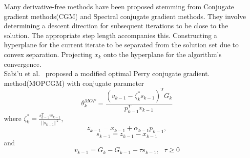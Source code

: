 \documentclass{article}
\theoremstyle{remark}
\begin{document}
Many derivative-free methods have been proposed stemming from Conjugate gradient methods(CGM) and Spectral conjugate gradient methods. They involve determining a descent direction for subsequent iterations to be close to the solution. The appropriate step length accompanies this. Constructing a hyperplane for the current iterate to be separated from the solution set due to convex separation. Projecting $x_k$ onto the hyperplane for the algorithm's convergence.\\
Sabi'u et al.~\cite{sabi2023modified} proposed a modified optimal Perry conjugate gradient. \\method(MOPCGM) with conjugate parameter
\begin{equation}
   \theta_k^{MOP}=\frac{(v_{k-1}-\zeta_k^*s_{k-1})^TG_k}{p_{k-1}^Tv_{k-1}} 
\end{equation}
 where $\zeta_k^*=\frac{s_{k-1}^Tw_{k-1}}{||s_{k-1}||^2}$,
 \begin{equation}
     z_{k-1}=x_{k-1}+\alpha_{k-1}p_{k-1},
 \end{equation}
\begin{equation}
    s_{k-1}=z_{k-1}-x_{k-1}
\end{equation}
and
\begin{equation}
    v_{k-1}=G_k-G_{k-1}+\tau s_{k-1}, ~~~\tau\geq 0
\end{equation}
\end{document}
